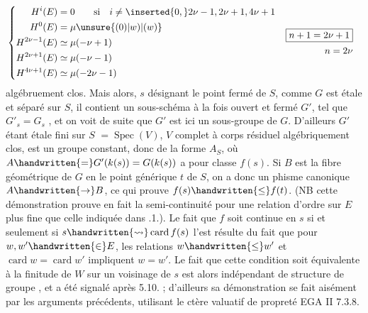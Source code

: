 \[
\begin{aligned}
&\left\{\begin{aligned}
H^{i}(E)&=0\qquad \text{si}\quad i\ne\inserted{0,}2\nu-1,2\nu+1,4\nu+1\\
H^0(E)&=\mu\unsure{(0)|w)|(w)}\\
H^{2\nu-1}(E)&\simeq\mu(-\nu+1)\\
H^{2\nu+1}(E)&\simeq\mu(-\nu-1)\\
H^{4\nu+1}(E)&\simeq\mu(-2\nu-1)
\end{aligned}\right.
&&\begin{aligned}\boxed{n+1=2\nu+1}\\n=2\nu\end{aligned}
\end{aligned}
\]
algébruement clos. Mais alors, $s$ désignant le point fermé de $S$, comme $G$ est étale et séparé sur $S$, il contient un sous-schéma à la fois ouvert et fermé $G'$,  tel que $G'_s=G_s$ , et on voit de suite que $G'$ est ici un sous-groupe de $G$.  D'ailleurs $G'$  étant étale fini sur $S$  $=\operatorname{Spec}(V)$, $V$ complet à corps résiduel algébriquement clos, est un groupe constant, donc de la forme $A_S$, où $A\handwritten{=}G'(k(s))=G(k(s))$ a pour classe $f(s)$.  Si $B$ est la fibre géométrique de $G$ en le point générique $t$ de $S$, on a donc un phisme canonique $A\handwritten{\to}B$, ce qui prouve $f(s)\handwritten{\leq} f(t)$. (NB cette démonstration prouve en fait la semi-continuité pour une relation d'ordre sur $E$ plus fine que celle indiquée dans .1.). Le fait que $f$ soit continue en $s$ si et seulement si $s\handwritten{\rightsquigarrow}\operatorname{card} f(s)$ l'est résulte du fait que pour $w,w'\handwritten{\in}E$, les relations  $w\handwritten{\leq}w'$ et $\operatorname{card} w=\operatorname{card} w'$ impliquent $w=w'$. Le fait que cette condition soit équivalente à la finitude de $W$ sur un voisinage de $s$ est alors indépendant de  structure de groupe , et a été signalé après  5.10. ; d'ailleurs sa démonstration  se fait aisément par les arguments précédents,  utilisant le ctère valuatif de propreté EGA II 7.3.8.

